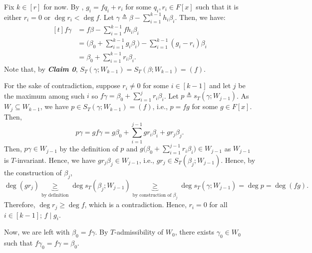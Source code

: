 \documentclass[MAS212_Note.tex]{subfiles}
\begin{document}
{    

    Fix \(k \in [r]\) for now.
    By , \(g_i = fq_i + r_i\)
    for some \(q_i, r_i \in F[x]\) such that it is either \(r_i = 0\)
    or \(\deg r_i < \deg f\).
    Let \(\gamma \triangleq \beta - \sum_{i=1}^{k-1} h_i \beta_i\).
    Then, we have:
    \[\begin{aligned}[t]
        f\gamma &= f\beta - \textstyle\sum_{i=1}^{k-1} fh_i \beta_i \\
                  &= \textstyle\big(\beta_0 + \sum_{i=1}^{k-1} g_i \beta_i\big)
                      - \sum_{i=1}^{k-1} (g_i-r_i) \beta_i \\
                  &= \textstyle \beta_0 + \sum_{i=1}^{k-1} r_i \beta_i.
    \end{aligned}\]
    Note that, by \textbf{\textit{Claim 0}}, \(S_T(\gamma; W_{k-1}) = S_T(\beta; W_{k-1}) = (f)\).

    For the sake of contradiction, suppose \(r_i \neq 0\) for some \(i \in [k-1]\) and
    let \(j\) be the maximum among such \(i\) so
    \(f\gamma = \beta_0 + \sum_{i=1}^{j} r_i \beta_i\).
    Let \(p \triangleq s_T(\gamma; W_{j-1})\).
    As \(W_j \subseteq W_{k-1}\), we have \(p \in S_T(\gamma; W_{k-1}) = (f)\), i.e.,
    \(p = fg\) for some \(g \in F[x]\). Then,
    \[\textstyle
        p \gamma = gf \gamma = g \beta_0 + \sum_{i=1}^{j-1} gr_i \beta_i + g r_j \beta_j.
    \]
    Then, \(p \gamma \in W_{j-1}\) by the definition of \(p\)
    and \(g \big(\beta_0 + \sum_{i=1}^{j-1} r_i \beta_i\big) \in W_{j-1}\)
    as \(W_{j-1}\) is \(T\)-invariant. Hence, we have \(g r_j \beta_j \in W_{j-1}\),
    i.e., \(g r_j \in S_T(\beta_j; W_{j-1})\).
    Hence, by the construction of \(\beta_j\), \[
        \deg (g r_j) 
        \underbrace{\ge}_{\text{by definition}}
        \deg s_T(\beta_j; W_{j-1})
        \underbrace{\ge}_{\text{by construction of } \beta_j}
        \deg s_T(\gamma; W_{j-1}) = \deg p = \deg (fg).
    \]
    Therefore, \(\deg r_j \ge \deg f\), which is a contradiction.
    Hence, \(r_i = 0\) for all \(i \in [k-1]\); \(f \mid g_i\).

    Now, we are left with \(\beta_0 = f \gamma\).
    By \(T\)-admissibility of \(W_0\), there exists \(\gamma_0 \in W_0\)
    such that \(f \gamma_0 = f \gamma = \beta_0\). \checkmark
    \vspace*{.7em}

}
\end{document}
